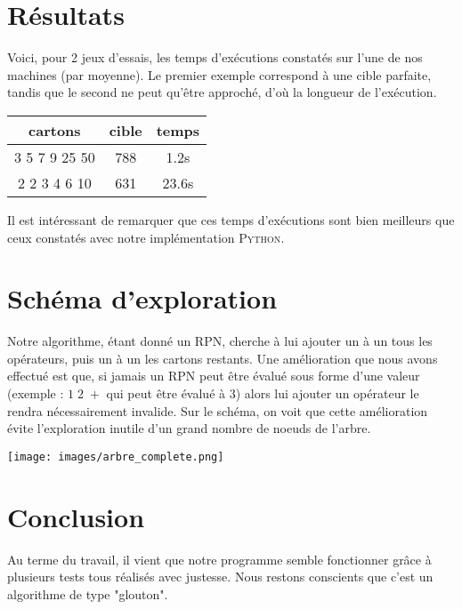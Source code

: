 \documentclass[11pt]{article}
\begin{document}
\section{Résultats}

Voici, pour 2 jeux d'essais, les temps d'exécutions constatés sur l'une de nos machines (par moyenne).
Le premier exemple correspond à une cible parfaite, tandis que le second ne peut qu'être approché, d'où la longueur de l'exécution.

\begin{center}
\begin{tabular}{||c c c||} 
 \hline
 cartons & cible & temps \\ [0.5ex] 
 \hline\hline
 3 5 7 9 25 50 & 788 & 1.2s \\ 
 \hline
 2 2 3 4 6 10 & 631 & 23.6s \\ [1ex] 
\hline
\end{tabular}
\end{center}

Il est intéressant de remarquer que ces temps d'exécutions sont bien meilleurs que ceux constatés avec notre implémentation \textsc{Python}.

\section{Schéma d'exploration}

Notre algorithme, étant donné un RPN, cherche à lui ajouter un à un tous les opérateurs, puis un à un les cartons restants.
Une amélioration que nous avons effectué est que, si jamais un RPN peut être évalué sous forme d'une valeur (exemple : $1 \; 2 \; +$ qui peut être évalué à $3$) alors lui ajouter un opérateur le rendra nécessairement invalide. Sur le schéma, on voit que cette amélioration évite l'exploration inutile d'un grand nombre de noeuds de l'arbre.

\begin{center}
\texttt{[image: images/arbre\_complete.png]}
\end{center}

\section{Conclusion}

\quad \quad Au terme du travail, il vient que notre programme semble fonctionner grâce à plusieurs tests tous réalisés avec justesse. Nous restons conscients que c'est un algorithme de type "glouton".
\end{document}
